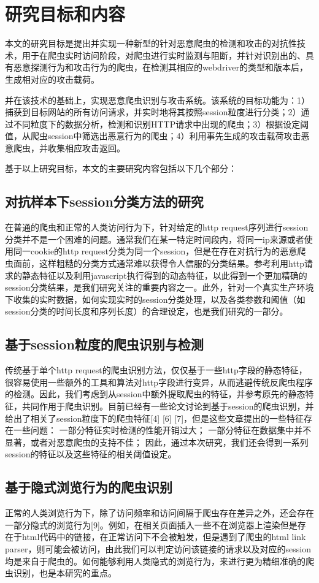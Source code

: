 \documentclass[doctor,privacy,twoside]{buaa_mac}
\begin{document}
\section{研究目标和内容}
本文的研究目标是提出并实现一种新型的针对恶意爬虫的检测和攻击的对抗性技术，用于在爬虫实时访问阶段，对爬虫进行实时监测与阻断，并针对识别出的、具有恶意探测行为和攻击行为的爬虫，在检测其相应的webdriver的类型和版本后，生成相对应的攻击载荷。

并在该技术的基础上，实现恶意爬虫识别与攻击系统。该系统的目标功能为：1）捕获到目标网站的所有访问请求，并实时地将其按照session粒度进行分类；2）通过不同粒度下的数据分析，检测和识别HTTP请求中出现的爬虫；3）根据设定阈值，从爬虫session中筛选出恶意行为的爬虫；4）利用事先生成的攻击载荷攻击恶意爬虫，并收集相应攻击返回。

基于以上研究目标，本文的主要研究内容包括以下几个部分：

\subsection{对抗样本下session分类方法的研究}
在普通的爬虫和正常的人类访问行为下，针对给定的http request序列进行session分类并不是一个困难的问题。通常我们在某一特定时间段内，将同一ip来源或者使用同一cookie的http request分类为同一个session，但是在存在对抗行为的恶意爬虫面前，这样粗糙的分类方式通常难以获得令人信服的分类结果。参考利用http请求的静态特征以及利用javascript执行得到的动态特征，以此得到一个更加精确的session分类结果，是我们研究关注的重要内容之一。此外，针对一个真实生产环境下收集的实时数据，如何实现实时的session分类处理，以及各类参数和阈值（如session分类的时间长度和序列长度）的合理设定，也是我们研究的一部分。

\subsection{基于session粒度的爬虫识别与检测}
传统基于单个http request的爬虫识别方法，仅仅基于一些http字段的静态特征，很容易使用一些额外的工具和算法对http字段进行变异，从而逃避传统反爬虫程序的检测。因此，我们考虑到从session中额外提取爬虫的特征，并参考原先的静态特征，共同作用于爬虫识别。目前已经有一些论文讨论到基于session的爬虫识别，并给出了相关了session粒度下的爬虫特征[4] [6] [7]，但是这些文章提出的一些特征存在一些问题：
一部分特征实时检测的性能开销过大；
一部分特征在数据集中并不显著，或者对恶意爬虫的支持不佳；
因此，通过本次研究，我们还会得到一系列session的特征以及这些特征的相关阈值设定。

\subsection{基于隐式浏览行为的爬虫识别}
正常的人类浏览行为下，除了访问频率和访问间隔于爬虫存在差异之外，还会存在一部分隐式的浏览行为[9]。例如，在相关页面插入一些不在浏览器上渲染但是存在于html代码中的链接，在正常访问下不会被触发，但是遇到了爬虫的html link parser，则可能会被访问，由此我们可以判定访问该链接的请求以及对应的session均是来自于爬虫的。如何能够利用人类隐式的浏览行为，来进行更为精细准确的爬虫识别，也是本研究的重点。
\end{document}
